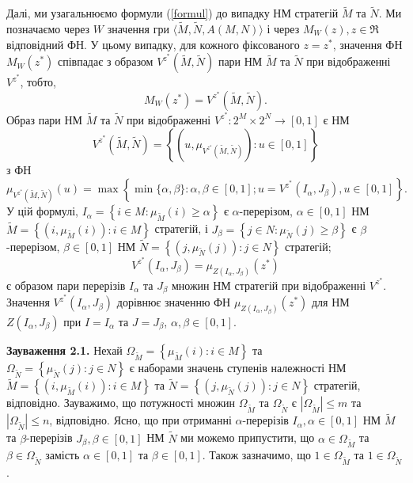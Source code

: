 \documentclass[14pt, a4paper, oneside]{extarticle}
\numberwithin{equation}{section}
\begin{document}
Далі, ми узагальнюємо формули (\ref{formul}) до випадку НМ стратегій $\tilde{M}$ та $\tilde{N}$. Ми позначаємо через $W$ значення гри $\langle\tilde{M}, \tilde{N}, A(M, N)\rangle$ і через $M_{W}(z), z \in \Re$ відповідний ФН. У цьому випадку, для кожного фіксованого $z=z^{*}$, значення ФН $M_{W}\left(z^{*}\right)$ співпадає з образом $V^{z^{*}}(\tilde{M}, \tilde{N})$ пари НМ $\tilde{M}$ та $\tilde{N}$ при відображенні $V^{z^{*}}$, тобто,
\begin{equation*}
M_{W}\left(z^{*}\right)=V^{z^{*}}(\tilde{M}, \tilde{N}).
\end{equation*}
Образ пари НМ $\tilde{M}$ та $\tilde{N}$ при відображенні $V^{z^{*}}: 2^{M} \times 2^{N} \rightarrow[0,1]$ є НМ
\begin{equation*}
V^{z^{*}}(\tilde{M}, \tilde{N})=\left\{\left(u, \mu_{V^{z^{*}}(\tilde{M}, \tilde{N})}\right): u \in[0,1]\right\}
\end{equation*}
з ФН
\begin{equation*}
    \mu_{V^{z^{*}}(\tilde{M}, \tilde{N})}(u)=\max \left\{\min \{\alpha, \beta\}: \alpha, \beta \in[0,1]; u=V^{z^{*}}\left(I_{\alpha}, J_{\beta}\right), u \in[0,1]\right\}.
\end{equation*}
У цій формулі, $I_{\alpha}=\left\{i \in M: \mu_{\tilde{M}}(i) \geq \alpha\right\}$ є $\alpha$-перерізом, $\alpha \in[0,1]$ НМ $\tilde{M}=\left\{\left(i, \mu_{\tilde{M}}(i)\right): i \in M\right\}$ стратегій, і $J_{\beta}=\left\{j \in N: \mu_{\tilde{N}}(j) \geq \beta\right\}$ є $\beta$-перерізом, $\beta \in[0,1]$ НМ $\tilde{N}=\left\{\left(j, \mu_{\tilde{N}}(j)\right): j \in N\right\}$ стратегій;
\begin{equation*}
V^{z^{*}}\left(I_{\alpha}, J_{\beta}\right)=\mu_{Z\left(I_{\alpha}, J_{\beta}\right)}\left(z^{*}\right)
\end{equation*}
є образом пари перерізів $I_{\alpha}$ та $J_{\beta}$ множин НМ стратегій при відображенні $V^{z^{*}}$. Значення $V^{z^{*}}\left(I_{\alpha}, J_{\beta}\right)$ дорівнює значенню ФН $\mu_{Z\left(I_{\alpha}, J_{\beta}\right)}\left(z^{*}\right)$
для НМ $Z\left(I_{\alpha}, J_{\beta}\right)$ при $I=I_{\alpha}$ та $J=J_{\beta}$, $\alpha, \beta \in[0,1]$.

\textbf{Зауваження 2.1.} Нехай $\Omega_{\tilde{M}}=\left\{\mu_{\tilde{M}}(i): i \in M\right\}$ та\\ $\Omega_{\tilde{N}}=\left\{\mu_{\tilde{N}}(j): j \in N\right\}$ є наборами значень ступенів належності НМ $\tilde{M}=\left\{\left(i, \mu_{\tilde{M}}(i)\right): i \in M\right\}$ та $\tilde{N}=\left\{\left(j, \mu_{\tilde{N}}(j)\right): j \in N\right\}$ стратегій, відповідно. Зауважимо, що потужності множин $\Omega_{\tilde{M}}$ та $\Omega_{\tilde{N}}$ є $\left|\Omega_{\tilde{M}}\right| \leq m$ та $\left|\Omega_{\tilde{N}}\right| \leq n$, відповідно. Ясно, що при отриманні $\alpha$-перерізів $I_{\alpha}, \alpha \in[0,1]$ НМ $\tilde{M}$ та $\beta$-перерізів $J_{\beta}, \beta \in[0,1]$ НМ $\tilde{N}$ ми можемо припустити, що $\alpha \in \Omega_{\tilde{M}}$ та $\beta \in \Omega_{\tilde{N}}$ замість $\alpha \in[0,1]$ та $\beta \in[0,1]$. Також зазначимо, що $1 \in \Omega_{\tilde{M}}$ та $1 \in \Omega_{\tilde{N}}$.
\end{document}

